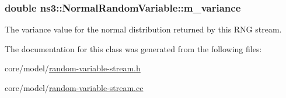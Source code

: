 \subsubsection[{\texorpdfstring{m\+\_\+variance}{m_variance}}]{\setlength{\rightskip}{0pt plus 5cm}double ns3\+::\+Normal\+Random\+Variable\+::m\+\_\+variance\hspace{0.3cm}{\ttfamily [private]}}\hypertarget{classns3_1_1NormalRandomVariable_aa61551cf5da3b7e76d6df6295129e399}{}\label{classns3_1_1NormalRandomVariable_aa61551cf5da3b7e76d6df6295129e399}
The variance value for the normal distribution returned by this R\+NG stream. 

The documentation for this class was generated from the following files\+:\begin{DoxyCompactItemize}
\item 
core/model/\hyperlink{random-variable-stream_8h}{random-\/variable-\/stream.\+h}\item 
core/model/\hyperlink{random-variable-stream_8cc}{random-\/variable-\/stream.\+cc}\end{DoxyCompactItemize}
